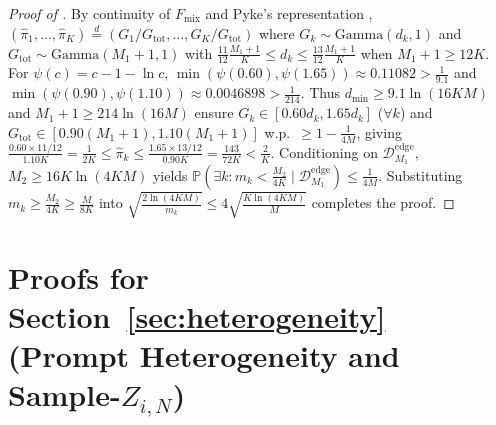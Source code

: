 \documentclass{article}
\theoremstyle{plain}
\theoremstyle{definition}
\theoremstyle{remark}
\newcommand{\Prob}{\mathbb{P}}
\newcommand{\Fmix}{F_{\mathrm{mix}}}
\begin{document}
\begin{proof}[Proof of ]
By continuity of $\Fmix$ and Pyke's representation \citep{pyke1965spacings}, $(\hat{\pi}_1,\dots,\hat{\pi}_K) \stackrel{d}{=} (G_1/G_{\mathrm{tot}},\dots,G_K/G_{\mathrm{tot}})$ where $G_k \sim \mathrm{Gamma}(d_k, 1)$ and $G_{\mathrm{tot}} \sim \mathrm{Gamma}(M_1+1, 1)$ with $\frac{11}{12}\frac{M_1+1}{K} \le d_k \le \frac{13}{12}\frac{M_1+1}{K}$ when $M_1+1 \ge 12K$. For $\psi(c) = c - 1 - \ln c$, $\min(\psi(0.60), \psi(1.65)) \approx 0.11082 > \frac{1}{9.1}$ and $\min(\psi(0.90), \psi(1.10)) \approx 0.0046898 > \frac{1}{214}$. Thus $d_{\min} \ge 9.1\ln(16KM)$ and $M_1+1 \ge 214\ln(16M)$ ensure $G_k \in [0.60 d_k, 1.65 d_k]$ ($\forall k$) and $G_{\mathrm{tot}} \in [0.90(M_1+1), 1.10(M_1+1)]$ w.p.\ $\ge 1 - \frac{1}{4M}$, giving $\frac{0.60\times 11/12}{1.10 K} = \frac{1}{2K} \le \hat{\pi}_k \le \frac{1.65\times 13/12}{0.90 K} = \frac{143}{72K} < \frac{2}{K}$. Conditioning on $\mathcal{D}_{M_1}^{\mathrm{edge}}$, $M_2 \ge 16K\ln(4KM)$ yields $\Prob(\exists k: m_k < \frac{M_2}{4K} \mid \mathcal{D}_{M_1}^{\mathrm{edge}}) \le \frac{1}{4M}$. Substituting $m_k \ge \frac{M_2}{4K} \ge \frac{M}{8K}$ into $\sqrt{\frac{2\ln(4KM)}{m_k}} \le 4\sqrt{\frac{K\ln(4KM)}{M}}$ completes the proof.
\end{proof}

\section{Proofs for Section~\texorpdfstring{\ref{sec:heterogeneity}}{5} (Prompt Heterogeneity and Sample-\texorpdfstring{$Z_{i,N}$}{Z\_i,N})}
\label{app:heterogeneity}
\end{document}
